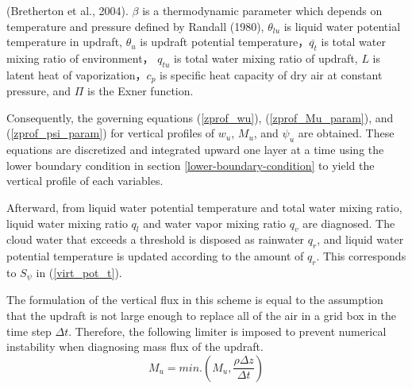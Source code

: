 (Bretherton et al., 2004). $\beta$ is a thermodynamic parameter which depends on temperature and pressure defined by Randall (1980), 
$\theta_{lu}$ is liquid water potential temperature in updraft, $\theta_u$ is updraft potential temperature，$\overline{q_t}$ is total water mixing ratio of environment，
$q_{tu}$ is total water mixing ratio of updraft, $L$ is latent heat of vaporization，$c_p$ is specific heat capacity of dry air at constant pressure, and $\Pi$ is the Exner function.

Consequently, the governing equations (\ref{zprof_wu}), (\ref{zprof_Mu_param}), and (\ref{zprof_psi_param}) for vertical profiles of $w_u$, $M_u$, and $\psi_u$ are obtained.
These equations are discretized and integrated upward one layer at a time using the lower boundary condition in section \ref{lower-boundary-condition} to yield the vertical profile of each variables.

Afterward, from liquid water potential temperature and total water mixing ratio, liquid water mixing ratio $q_l$ and water vapor mixing ratio $q_v$ are diagnosed.
The cloud water that exceeds a threshold is disposed as rainwater $q_r$, and liquid water potential temperature is updated according to the amount of $q_r$. This corresponds to $S_\psi$ in (\ref{virt_pot_t}).

The formulation of the vertical flux in this scheme is equal to the assumption that the updraft is not large enough to replace all of the air in a grid box in the time step $\Delta t$.
Therefore, the following limiter is imposed to prevent numerical instability when diagnosing mass flux of the updraft.
\begin{equation}\label{Mu_limit}
    M_u = min.\left(M_u, \frac{\rho\Delta z}{\Delta t}\right)    
\end{equation}

